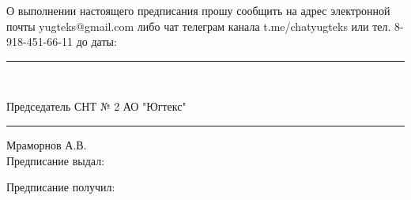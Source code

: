 \vspace{4mm}
О выполнении настоящего предписания прошу сообщить на адрес электронной почты yugteks@gmail.com либо  чат телеграм канала t.me/chatyugteks или тел. 8-918-451-66-11 до  даты:  \rule{3.5cm}{0.1 mm} \\
\vspace{5mm}

\noindent Председатель СНТ № 2 АО "Югтекс" \hfill    \rule{4cm}{0.1 mm}    Мраморнов А.В.\\[7mm]
\noindent Предписание выдал:  \podpisv{ }{ }

\vspace{5mm}

\noindent Предписание получил: \podpisp{ }{ }
